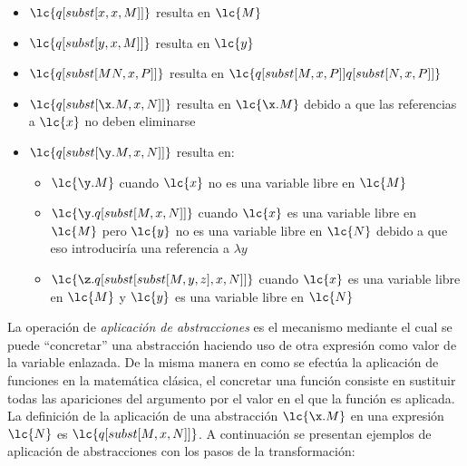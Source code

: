 \begin{itemize}
\item \(\lc{q[subst[x,x,M]]}\) resulta en \(\lc{M}\)
\item \(\lc{q[subst[y,x,M]]}\) resulta en \(\lc{y}\)
\item \(\lc{q[subst[M N, x, P]]}\) resulta en \(\lc{q[subst[M, x, P]] q[subst[N,
    x, P]]}\)
\item \(\lc{q[subst[\x.M, x, N]]}\) resulta en \(\lc{\x.M}\) debido a que las
  referencias a \(\lc{x}\) no deben eliminarse
\item \(\lc{q[subst[\y.M, x, N]]}\) resulta en:
  \begin{itemize}
  \item \(\lc{\y.M}\) cuando \(\lc{x}\) no es una variable libre en \(\lc{M}\)
  \item \(\lc{\y.q[subst[M, x, N]]}\) cuando \(\lc{x}\) es una variable libre en
    \(\lc{M}\) pero \(\lc{y}\) no es una variable libre en \(\lc{N}\) debido a que
    eso introduciría una referencia a \(\lambda y\)
  \item \(\lc{\z.q[subst[subst[M,y,z],x,N]]}\) cuando \(\lc{x}\) es una variable
    libre en \(\lc{M}\) y \(\lc{y}\) es una variable libre en \(\lc{N}\)
  \end{itemize}
\end{itemize}

La operación de \emph{aplicación de abstracciones} es el mecanismo mediante el cual
se puede ``concretar'' una abstracción haciendo uso de otra expresión como valor
de la variable  enlazada. De la misma manera en como se efectúa la
aplicación de funciones en la matemática clásica, el concretar una función
consiste en sustituir todas las apariciones del argumento por el valor en el que
la función es aplicada. \\

La definición de la aplicación de una abstracción \(\lc{\x.M}\) en una expresión
\(\lc{N}\) es \(\lc{q[subst[M,x,N]]}\). A continuación se presentan ejemplos de
aplicación de abstracciones con los pasos de la transformación: \\

